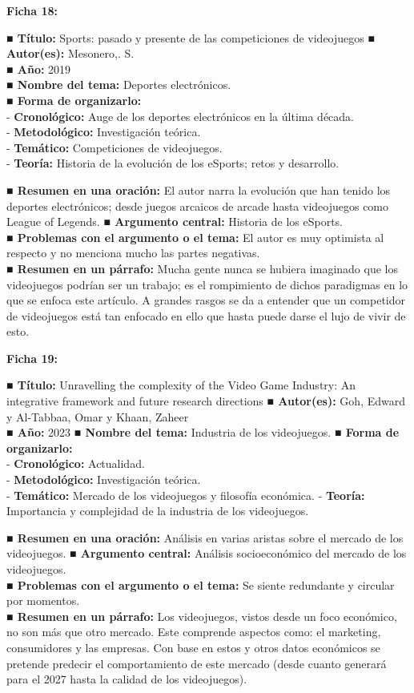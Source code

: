 \documentclass[
  letterpaper,
  DIV=11,
  numbers=noendperiod]{scrreprt}
\begin{document}
\textbf{Ficha 18:}

\textbf{■ Título:} Sports: pasado y presente de las competiciones de
videojuegos \textbf{■ Autor(es):} Mesonero,. S.\\
\textbf{■ Año:} 2019\\
\textbf{■ Nombre del tema:} Deportes electrónicos.\\
\textbf{■ Forma de organizarlo:}\\
- \textbf{Cronológico:} Auge de los deportes electrónicos en la última
década.\\
- \textbf{Metodológico:} Investigación teórica.\\
- \textbf{Temático:} Competiciones de videojuegos.\\
- \textbf{Teoría:} Historia de la evolución de los eSports; retos y
desarrollo.

\textbf{■ Resumen en una oración:} El autor narra la evolución que han
tenido los deportes electrónicos; desde juegos arcaicos de arcade hasta
videojuegos como League of Legends. \textbf{■ Argumento central:}
Historia de los eSports.\\
\textbf{■ Problemas con el argumento o el tema:} El autor es muy
optimista al respecto y no menciona mucho las partes negativas.\\
\textbf{■ Resumen en un párrafo:} Mucha gente nunca se hubiera imaginado
que los videojuegos podrían ser un trabajo; es el rompimiento de dichos
paradigmas en lo que se enfoca este artículo. A grandes rasgos se da a
entender que un competidor de videojuegos está tan enfocado en ello que
hasta puede darse el lujo de vivir de esto.

\textbf{Ficha 19:}

\textbf{■ Título:} Unravelling the complexity of the Video Game
Industry: An integrative framework and future research directions
\textbf{■ Autor(es):} Goh, Edward y Al-Tabbaa, Omar y Khaan, Zaheer\\
\textbf{■ Año:} 2023 \textbf{■ Nombre del tema:} Industria de los
videojuegos. \textbf{■ Forma de organizarlo:}\\
- \textbf{Cronológico:} Actualidad.\\
- \textbf{Metodológico:} Investigación teórica.\\
- \textbf{Temático:} Mercado de los videojuegos y filosofía económica. -
\textbf{Teoría:} Importancia y complejidad de la industria de los
videojuegos.

\textbf{■ Resumen en una oración:} Análisis en varias aristas sobre el
mercado de los videojuegos. \textbf{■ Argumento central:} Análisis
socioeconómico del mercado de los videojuegos.\\
\textbf{■ Problemas con el argumento o el tema:} Se siente redundante y
circular por momentos.\\
\textbf{■ Resumen en un párrafo:} Los videojuegos, vistos desde un foco
económico, no son más que otro mercado. Este comprende aspectos como: el
marketing, consumidores y las empresas. Con base en estos y otros datos
económicos se pretende predecir el comportamiento de este mercado (desde
cuanto generará para el 2027 hasta la calidad de los videojuegos).
\end{document}
